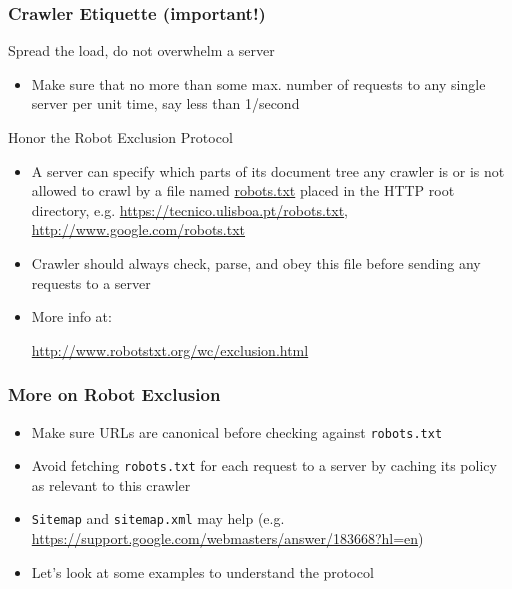 \documentclass{beamer}
\begin{document}
\begin{frame} \frametitle{Crawler Etiquette (important!)}

\begin{block}{Spread the load, do not overwhelm a server}
\begin{itemize}
\item Make sure that no more than some max. number of requests to any single
server per unit time, say less than 1/second
\end{itemize}
\end{block}

\begin{block}{Honor the Robot Exclusion Protocol}
\begin{itemize}

\item A server can specify which parts of its document tree any crawler is or is not allowed to crawl by a file named \url{robots.txt} placed in the HTTP root directory, e.g. \url{https://tecnico.ulisboa.pt/robots.txt}, \url{http://www.google.com/robots.txt}

\item Crawler should always check, parse, and obey this file before sending any requests to a server

\item More info at:

\url{http://www.robotstxt.org/wc/exclusion.html}

\end{itemize}

\end{block}

\end{frame}


\begin{frame} \frametitle{More on Robot Exclusion}

\begin{itemize}
\item Make sure URLs are canonical before checking against {\tt robots.txt} 

\item Avoid fetching {\tt robots.txt} for each request to a server by
  caching its policy as relevant to this crawler

\item {\tt Sitemap} and {\tt sitemap.xml} may help (e.g. \url{https://support.google.com/webmasters/answer/183668?hl=en})

\item Let's look at some examples to understand the protocol

\end{itemize}
\end{frame}
\end{document}
